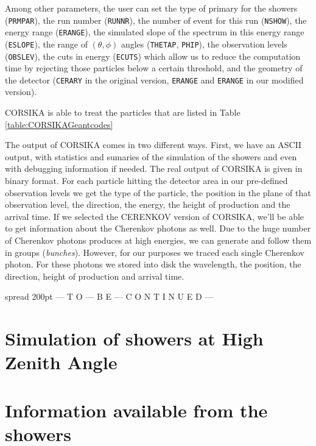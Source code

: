 \documentclass[12pt]{article}
\def\CORSIKA{\textsf{CORSIKA}\xspace}
\def\cerenkov{Cherenkov\xspace}             %
\def\Cherenkov{\cerenkov}                   %
\def\MORE{\par{\centering \mbox{} \hbox spread 200pt{%
--- T O --- B E --- C O N T I N U E D ---%
}\\}\par}
\begin{document}
\CORSIKAsampleInputfig

Among other parameters, the user can set the type of primary for the
showers (\texttt{PRMPAR}), the run number (\texttt{RUNNR}), the number
of event for this run (\texttt{NSHOW}), the energy range
(\texttt{ERANGE}), the simulated slope of the spectrum in this energy
range (\texttt{ESLOPE}), the range of $(\theta,\phi)$ angles
(\texttt{THETAP}, \texttt{PHIP}), the observation levels
(\texttt{OBSLEV}), the cuts in energy (\texttt{ECUTS}) which allow us
to reduce the computation time by rejecting those particles below a
certain threshold, and the geometry of the detector (\texttt{CERARY}
in the original version, \texttt{ERANGE} and \texttt{ERANGE} in our
modified version).

\CORSIKA is able to treat the particles that are listed in Table
\ref{table:CORSIKAGeantcodes}

\CORSIKAGeanttableA

\CORSIKAGeanttableB

The output of \CORSIKA comes in two different ways. First, we have an
ASCII output, with statistics and sumaries of the simulation of the
showers and even with debugging information if needed.  The real
output of \CORSIKA is given in binary format. For each particle hitting
the detector area in our pre-defined observation levels we get the
type of the particle, the position in the plane of that observation
level, the direction, the energy, the height of production and the
arrival time. If we selected the CERENKOV version of \CORSIKA, we'll be
able to get information about the \Cherenkov photons as well. Due to
the huge number of \Cherenkov photons produces at high energies, we
can generate and follow them in groups (\emph{bunches}).  However, for
our purposes we traced each single \Cherenkov photon. For these
photons we stored into disk the wavelength, the position, the
direction, height of production and arrival time.


\MORE%

\section{Simulation of showers at High Zenith Angle}

\section{Information available from the showers}
\end{document}
